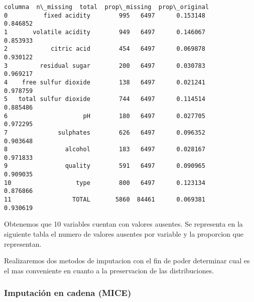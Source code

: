 \documentclass[11pt]{article}
\makeatletter
\newcommand{\boxspacing}{\kern\kvtcb@left@rule\kern\kvtcb@boxsep}
\newcommand{\prompt}[4]{
        {\ttfamily\llap{{\color{#2}[#3]:\hspace{3pt}#4}}\vspace{-\baselineskip}}
    }
\makeatother
\begin{document}
            \begin{tcolorbox}[breakable, size=fbox, boxrule=.5pt, pad at break*=1mm, opacityfill=0]
\prompt{Out}{outcolor}{13}{\boxspacing}
\begin{Verbatim}[commandchars=\\\{\}]
                 columna  n\_missing  total  prop\_missing  prop\_original
0          fixed acidity        995   6497      0.153148       0.846852
1       volatile acidity        949   6497      0.146067       0.853933
2            citric acid        454   6497      0.069878       0.930122
3         residual sugar        200   6497      0.030783       0.969217
4    free sulfur dioxide        138   6497      0.021241       0.978759
5   total sulfur dioxide        744   6497      0.114514       0.885486
6                     pH        180   6497      0.027705       0.972295
7              sulphates        626   6497      0.096352       0.903648
8                alcohol        183   6497      0.028167       0.971833
9                quality        591   6497      0.090965       0.909035
10                  type        800   6497      0.123134       0.876866
11                 TOTAL       5860  84461      0.069381       0.930619
\end{Verbatim}
\end{tcolorbox}
        
    Obtenemos que 10 variables cuentan con valores ausentes. Se representa
en la siguiente tabla el numero de valores ausentes por variable y la
proporcion que representan.

Realizaremos dos metodos de imputacion con el fin de poder determinar
cual es el mas conveniente en cuanto a la preservacion de las
distribuciones.

    \hypertarget{imputaciuxf3n-en-cadena-mice}{%
\subsubsection{Imputación en cadena
(MICE)}\label{imputaciuxf3n-en-cadena-mice}}
\end{document}
